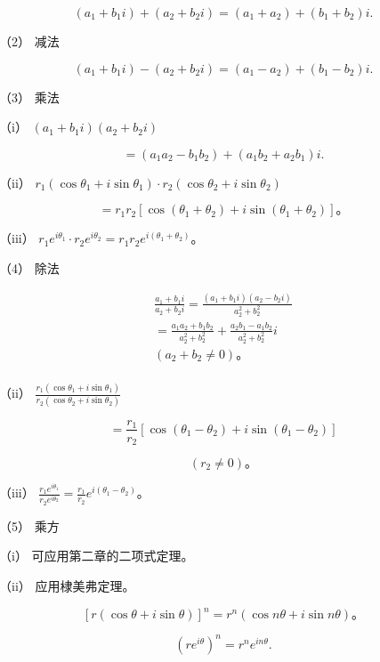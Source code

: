 \[
(a _ {1} + b _ {1} i) + (a _ {2} + b _ {2} i) = (a _ {1} + a _ {2}) + (b _ {1} + b _ {2}) i.
\]

（2） 减法

\[
(a _ {1} + b _ {1} i) - (a _ {2} + b _ {2} i) = (a _ {1} - a _ {2}) + (b _ {1} - b _ {2}) i.
\]

（3） 乘法

（i） \((a_{1} + b_{1}i)(a_{2} + b_{2}i)\)

\[
= \left(a _ {1} a _ {2} - b _ {1} b _ {2}\right) + \left(a _ {1} b _ {2} + a _ {2} b _ {1}\right) i.
\]

（ii）
\(r_1(\cos \theta_1 + i\sin \theta_1) \cdot r_2(\cos \theta_2 + i\sin \theta_2)\)

\[
= r _ {1} r _ {2} \left[ \cos \left(\theta_ {1} + \theta_ {2}\right) + i \sin \left(\theta_ {1} + \theta_ {2}\right) \right]\text{。}
\]

（iii）
\(r_1e^{i\theta_1} \cdot r_2e^{i\theta_2} = r_1r_2e^{i(\theta_1 + \theta_2)}\)。

（4） 除法

\[
\begin{array}{l} \frac {a _ {1} + b _ {1} i}{a _ {2} + b _ {2} i} = \frac {(a _ {1} + b _ {1} i) (a _ {2} - b _ {2} i)}{a _ {2} ^ {2} + b _ {2} ^ {2}} \\ = \frac {a _ {1} a _ {2} + b _ {1} b _ {2}}{a _ {2} ^ {2} + b _ {2} ^ {2}} + \frac {a _ {2} b _ {1} - a _ {1} b _ {2}}{a _ {2} ^ {2} + b _ {2} ^ {2}} i \\ \left(a _ {2} + b _ {2} \neq 0\right)\text{。} \\ \end{array}
\]

（ii）
\(\frac{r_1(\cos\theta_1 + i\sin\theta_1)}{r_2(\cos\theta_2 + i\sin\theta_2)}\)

\[
= \frac {r _ {1}}{r _ {2}} [ \cos (\theta_ {1} - \theta_ {2}) + i \sin (\theta_ {1} - \theta_ {2}) ]
\]

\[
(r _ {2} \neq 0)\text{。}
\]

（iii）
\(\frac{r_1e^{i\theta_1}}{r_2e^{i\theta_2}}=\frac{r_1}{r_2}e^{i(\theta_1-\theta_2)}\)。

（5） 乘方

（i） 可应用第二章的二项式定理。

（ii） 应用棣美弗定理。

\[
[ r (\cos \theta + i \sin \theta) ] ^ {n} = r ^ {n} (\cos n \theta + i \sin n \theta)\text{。}
\]

\[
(r e ^ {i \theta}) ^ {n} = r ^ {n} e ^ {i n \theta}.
\]

